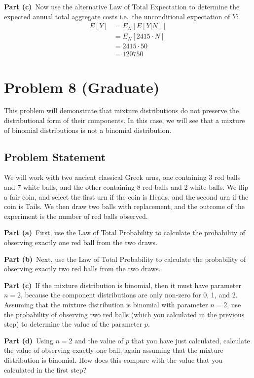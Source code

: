 \documentclass[12pt]{article}
\theoremstyle{definition}
\begin{document}
\noindent
{\bf Part (c)}\ Now use the alternative Law of Total Expectation to determine the expected annual total aggregate costs i.e.\ the unconditional expectation of $Y$:
\begin{align*}
E[Y] &= E_N[E[Y|N]]\\
&= E_N[2415\cdot N]\\
&= 2415\cdot 50\\
&= 120750
\end{align*}

\newpage
\section*{Problem 8 (Graduate)}

This problem will demonstrate that mixture distributions do not preserve the distributional form of their components. In this case, we will see that a mixture of binomial distributions is not a binomial distribution.

\subsection*{Problem Statement}

We will work with two ancient classical Greek urns, one containing 3 red balls and 7 white balls, and the other containing 8 red balls and 2 white balls. We flip a fair coin, and select the first urn if the coin is Heads, and the second urn if the coin is Tails. We then draw two balls with replacement, and the outcome of the experiment is the number of red balls observed.

\bigskip
\noindent
{\bf Part (a)}\ First, use the Law of Total Probability to calculate the probability of observing exactly one red ball from the two draws.

\bigskip
\noindent
{\bf Part (b)}\ Next, use the Law of Total Probability to calculate the probability of observing exactly two red balls from the two draws.

\bigskip
\noindent
{\bf Part (c)}\ If the mixture distribution is binomial, then it must have parameter $n = 2$, because the component distributions are only non-zero for 0, 1, and 2. Assuming that the  mixture distribution is binomial with parameter $n = 2$, use the probability of observing two red balls (which you calculated in the previous step) to determine the value of the parameter $p$.

\bigskip
\noindent
{\bf Part (d)}\ Using $n = 2$ and the value of $p$ that you have just calculated, calculate the value of observing exactly one ball, again assuming that the mixture distribution is binomial. How does this compare with the value that you calculated in the first step?
\end{document}
